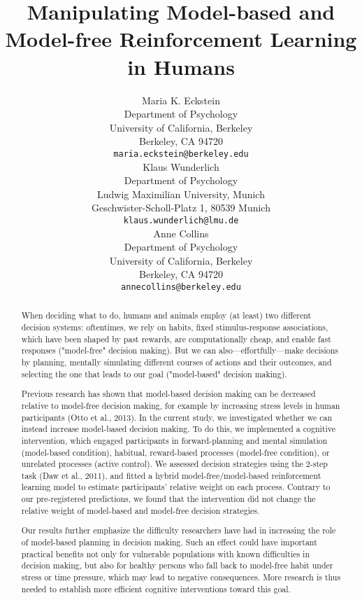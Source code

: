 \documentclass[11pt]{article} %
\title{Manipulating Model-based and Model-free Reinforcement Learning in Humans}
\author{
Maria K. Eckstein \\
Department of Psychology \\
University of California, Berkeley \\
Berkeley, CA 94720 \\
\texttt{maria.eckstein@berkeley.edu} \\
\And
Klaus Wunderlich \\
Department of Psychology \\
Ludwig Maximilian University, Munich \\
Geschwister-Scholl-Platz 1, 80539 Munich \\
\texttt{klaus.wunderlich@lmu.de} \\
\And
Anne Collins \\
Department of Psychology\\
University of California, Berkeley \\
Berkeley, CA 94720  \\
\texttt{annecollins@berkeley.edu} \\
}
\begin{document}
\maketitle

\begin{abstract}

When deciding what to do, humans and animals employ (at least) two different decision systems: oftentimes, we rely on habits, fixed stimulus-response associations, which have been shaped by past rewards, are computationally cheap, and enable fast responses ("model-free" decision making). But we can also---effortfully---make decisions by planning, mentally simulating different courses of actions and their outcomes, and selecting the one that leads to our goal ("model-based" decision making). 

Previous research has shown that model-based decision making can be decreased relative to model-free decision making, for example by increasing stress levels in human participants (Otto et al., 2013). In the current study, we investigated whether we can instead increase model-based decision making. To do this, we implemented a cognitive intervention, which engaged participants in forward-planning and mental simulation (model-based condition), habitual, reward-based processes (model-free condition), or unrelated processes (active control). We assessed decision strategies using the 2-step task (Daw et al., 2011), and fitted a hybrid model-free/model-based reinforcement learning model to estimate participants' relative weight on each process. Contrary to our pre-registered predictions, we found that the intervention did not change the relative weight of model-based and model-free decision strategies. 

Our results further emphasize the difficulty researchers have had in increasing the role of model-based planning in decision making. Such an effect could have important practical benefits not only for vulnerable populations with known difficulties in decision making, but also for healthy persons who fall back to model-free habit under stress or time pressure, which may lead to negative consequences. More research is thus needed to establish more efficient cognitive interventions toward this goal.

\end{abstract}
\end{document}
